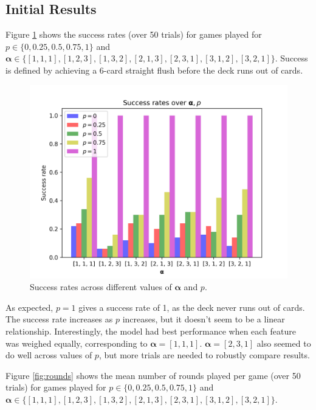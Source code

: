 \documentclass[11pt]{article}
\begin{document}
\subsection{Initial Results}

Figure \ref{fig:success} shows the success rates (over 50 trials) for games played for $p \in \{0, 0.25, 0.5, 0.75, 1\}$ and $\bm{\alpha} \in \{[1,1,1], [1,2,3], [1,3,2], [2,1,3], [2,3,1], [3,1,2], [3,2,1]\}$. Success is defined by achieving a 6-card straight flush before the deck runs out of cards.

\begin{figure}[hpt]
  \centering
  \captionsetup{justification=centering,margin=2cm}
  \includegraphics[scale=0.8]{../plots/successAlphaP.png}
  \caption{Success rates across different values of $\bm{\alpha}$ and $p$.} %
  \label{fig:success}
\end{figure}

As expected, $p=1$ gives a success rate of 1, as the deck never runs out of cards. The success rate increases as $p$ increases, but it doesn't seem to be a linear relationship. Interestingly, the model had best performance when each feature was weighed equally, corresponding to $\bm{\alpha} = [1,1,1]$. $\bm{\alpha} = [2,3,1]$ also seemed to do well across values of $p$, but more trials are needed to robustly compare results.

Figure \ref{fig:rounds} shows the mean number of rounds played per game (over 50 trials) for games played for $p \in \{0, 0.25, 0.5, 0.75, 1\}$ and $\bm{\alpha} \in \{[1,1,1], [1,2,3], [1,3,2], [2,1,3], [2,3,1], [3,1,2], [3,2,1]\}$.
\end{document}
